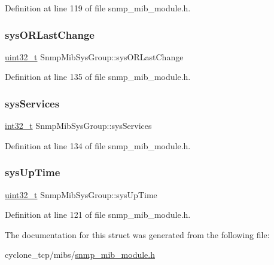 Definition at line 119 of file snmp\+\_\+mib\+\_\+module.\+h.

\mbox{\label{structSnmpMibSysGroup_abbd4d54898ea9e75c4223ebdfa02799c}} 
\subsubsection{\texorpdfstring{sys\+O\+R\+Last\+Change}{sysORLastChange}}
{\footnotesize\ttfamily \hyperlink{stdint_8h_a435d1572bf3f880d55459d9805097f62}{uint32\+\_\+t} Snmp\+Mib\+Sys\+Group\+::sys\+O\+R\+Last\+Change}



Definition at line 135 of file snmp\+\_\+mib\+\_\+module.\+h.

\mbox{\label{structSnmpMibSysGroup_a163e0fdf384e7ded63f636235c8166ee}} 
\subsubsection{\texorpdfstring{sys\+Services}{sysServices}}
{\footnotesize\ttfamily \hyperlink{stdint_8h_ab1967d8591af1a4e48c37fd2b0f184d0}{int32\+\_\+t} Snmp\+Mib\+Sys\+Group\+::sys\+Services}



Definition at line 134 of file snmp\+\_\+mib\+\_\+module.\+h.

\mbox{\label{structSnmpMibSysGroup_a737408e6c21f6310c08887f9ed98e2d0}} 
\subsubsection{\texorpdfstring{sys\+Up\+Time}{sysUpTime}}
{\footnotesize\ttfamily \hyperlink{stdint_8h_a435d1572bf3f880d55459d9805097f62}{uint32\+\_\+t} Snmp\+Mib\+Sys\+Group\+::sys\+Up\+Time}



Definition at line 121 of file snmp\+\_\+mib\+\_\+module.\+h.



The documentation for this struct was generated from the following file\+:\begin{DoxyCompactItemize}
\item 
cyclone\+\_\+tcp/mibs/\hyperlink{snmp__mib__module_8h}{snmp\+\_\+mib\+\_\+module.\+h}\end{DoxyCompactItemize}
